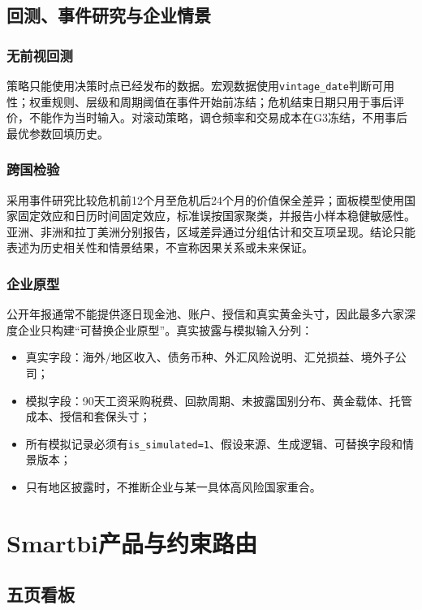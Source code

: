 \documentclass[UTF8,fontset=windows,12pt,openany]{ctexbook}
\newcommand{\Field}[1]{{\small\nolinkurl{#1}}}
\begin{document}
\chapter{回测、事件研究与企业情景}

\section{无前视回测}

策略只能使用决策时点已经发布的数据。宏观数据使用\Field{vintage_date}判断可用性；权重规则、层级和周期阈值在事件开始前冻结；危机结束日期只用于事后评价，不能作为当时输入。对滚动策略，调仓频率和交易成本在G3冻结，不用事后最优参数回填历史。

\section{跨国检验}

采用事件研究比较危机前12个月至危机后24个月的价值保全差异；面板模型使用国家固定效应和日历时间固定效应，标准误按国家聚类，并报告小样本稳健敏感性。亚洲、非洲和拉丁美洲分别报告，区域差异通过分组估计和交互项呈现。结论只能表述为历史相关性和情景结果，不宣称因果关系或未来保证。

\section{企业原型}

公开年报通常不能提供逐日现金池、账户、授信和真实黄金头寸，因此最多六家深度企业只构建“可替换企业原型”。真实披露与模拟输入分列：

\begin{itemize}
  \item 真实字段：海外/地区收入、债务币种、外汇风险说明、汇兑损益、境外子公司；
  \item 模拟字段：90天工资采购税费、回款周期、未披露国别分布、黄金载体、托管成本、授信和套保头寸；
  \item 所有模拟记录必须有\Field{is_simulated=1}、假设来源、生成逻辑、可替换字段和情景版本；
  \item 只有地区披露时，不推断企业与某一具体高风险国家重合。
\end{itemize}

\part{Smartbi产品与约束路由}

\chapter{五页看板}
\end{document}
